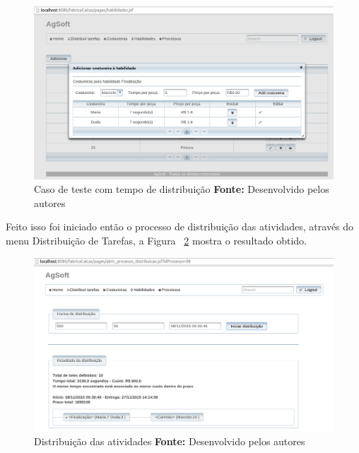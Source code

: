 \begin{figure}[h!]
	\centerline{\includegraphics[scale=0.3]{./imagens/cofig_at_finalizaca_teste4.png}}
	\caption[Caso de teste com tempo de distribuição]
	{Caso de teste com tempo de distribuição \textbf{Fonte:} Desenvolvido pelos autores}
	\label{fig:at_finalizacao_teste4}
\end{figure}

\newpage

\par Feito isso foi iniciado então o processo de distribuição das atividades,
através do menu Distribuição de Tarefas, a Figura
~\ref{fig:resultado_transporte_teste4} mostra o resultado obtido.


\begin{figure}[h!]
	\centerline{\includegraphics[scale=0.3]{./imagens/resultado_transporte_teste4.png}}
	\caption[Distribuição das atividades]
	{Distribuição das atividades \textbf{Fonte:} Desenvolvido pelos autores}
	\label{fig:resultado_transporte_teste4}
\end{figure}

